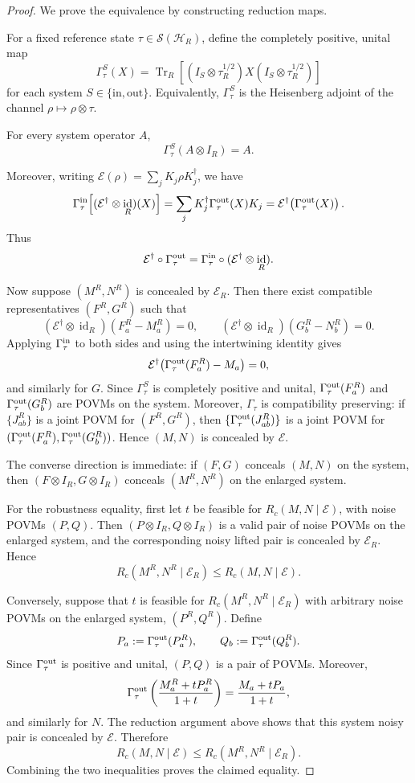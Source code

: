 \documentclass[
aps,pra,twocolumn,10pt,
superscriptaddress,longbibliography,floatfix
]{revtex4-2}
\DeclareMathOperator{\id}{id}
\begin{document}
\begin{proof}
We prove the equivalence by constructing reduction maps.

For a fixed reference state $\tau\in\mathcal S(\mathcal H_R)$, define the completely positive, unital map
\[
\Gamma_\tau^S(X)=\operatorname{Tr}_R\!\left[
(I_S\otimes\tau_R^{1/2})X(I_S\otimes\tau_R^{1/2})
\right]
\]
for each system $S\in\{\text{in},\text{out}\}$. Equivalently, $\Gamma_\tau^S$ is the Heisenberg adjoint of the channel $\rho\mapsto\rho\otimes\tau$.

For every system operator $A$,
\[
\Gamma_\tau^S(A\otimes I_R)=A.
\]

Moreover, writing $\mathcal E(\rho)=\sum_jK_j\rho K_j^\dagger$, we have
\[
\Gamma_\tau^{\rm in}
\!\left[(\mathcal E^\dagger\otimes\id_R)(X)\right]
=
\sum_jK_j^\dagger\Gamma_\tau^{\rm out}(X)K_j
=
\mathcal E^\dagger\!\left(\Gamma_\tau^{\rm out}(X)\right).
\]
Thus
\[
\mathcal E^\dagger\circ\Gamma_\tau^{\rm out}
=
\Gamma_\tau^{\rm in}\circ
(\mathcal E^\dagger\otimes\id_R).
\]

Now suppose $(M^R,N^R)$ is concealed by $\mathcal E_R$. Then there exist compatible representatives $(F^R,G^R)$ such that
\[
(\mathcal E^\dagger\otimes\id_R)(F^R_a-M^R_a)=0,
\qquad
(\mathcal E^\dagger\otimes\id_R)(G^R_b-N^R_b)=0.
\]
Applying $\Gamma_\tau^{\rm in}$ to both sides and using the intertwining identity gives
\[
\mathcal E^\dagger\!\left(\Gamma_\tau^{\rm out}(F^R_a)-M_a\right)=0,
\]
and similarly for $G$. Since $\Gamma_\tau^S$ is completely positive and unital, $\Gamma_\tau^{\rm out}(F^R_a)$ and $\Gamma_\tau^{\rm out}(G^R_b)$ are POVMs on the system. Moreover, $\Gamma_\tau$ is compatibility preserving: if $\{J_{ab}^{R}\}$ is a joint POVM for $(F^R,G^R)$, then $\{\Gamma_\tau^{\rm out}(J_{ab}^{R})\}$ is a joint POVM for $(\Gamma_\tau^{\rm out}(F^R_a),\Gamma_\tau^{\rm out}(G^R_b))$. Hence $(M,N)$ is concealed by $\mathcal E$.

The converse direction is immediate: if $(F,G)$ conceals $(M,N)$ on the system, then $(F\otimes I_R,G\otimes I_R)$ conceals $(M^R,N^R)$ on the enlarged system.

For the robustness equality, first let $t$ be feasible for $R_c(M,N\mid\mathcal E)$, with noise POVMs $(P,Q)$. Then $(P\otimes I_R,Q\otimes I_R)$ is a valid pair of noise POVMs on the enlarged system, and the corresponding noisy lifted pair is concealed by $\mathcal E_R$. Hence
\[
R_c(M^R,N^R\mid\mathcal E_R)
\le
R_c(M,N\mid\mathcal E).
\]

Conversely, suppose that $t$ is feasible for $R_c(M^R,N^R\mid\mathcal E_R)$ with arbitrary noise POVMs on the enlarged system, $(P^R,Q^R)$. Define
\[
P_a:=\Gamma_\tau^{\rm out}(P_a^R),
\qquad
Q_b:=\Gamma_\tau^{\rm out}(Q_b^R).
\]
Since $\Gamma_\tau^{\rm out}$ is positive and unital, $(P,Q)$ is a pair of POVMs. Moreover,
\[
\Gamma_\tau^{\rm out}
\left(
\frac{M_a^R+tP_a^R}{1+t}
\right)
=
\frac{M_a+tP_a}{1+t},
\]
and similarly for $N$. The reduction argument above shows that this system noisy pair is concealed by $\mathcal E$. Therefore
\[
R_c(M,N\mid\mathcal E)
\le
R_c(M^R,N^R\mid\mathcal E_R).
\]
Combining the two inequalities proves the claimed equality.


\end{proof}
\end{document}
